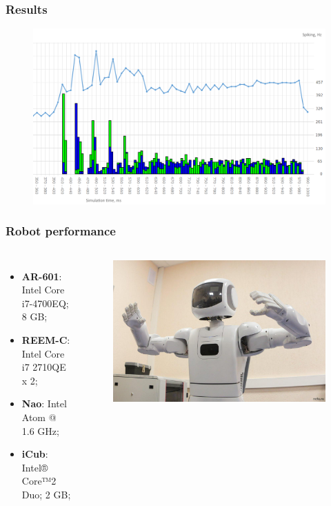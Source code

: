 \documentclass[12pt, aspectratio=169]{beamer}
\begin{document}


\begin{frame}
\frametitle{Results}
\begin{figure}
\includegraphics[width=0.8\linewidth]{resultBIG_short}
\end{figure}
\end{frame}



\begin{frame}
\frametitle{Robot performance}
\begin{columns}[c] %

\begin{itemize}
\item \textbf{AR-601}: Intel Core i7-4700EQ; 8 GB;
\item \textbf{REEM-C}: Intel Core i7 2710QE x 2;
\item \textbf{Nao}: Intel Atom @ 1.6 GHz;
\item \textbf{iCub}: Intel® Core™2 Duo; 2 GB;
\end{itemize}


\begin{figure}
\includegraphics[width=1.0\linewidth]{AR-601}
\end{figure}
\end{columns}
\end{frame}
\end{document}
